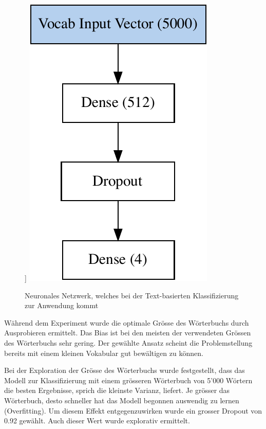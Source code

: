 \begin{figure}[h!]
    \captionsetup{width=.9\linewidth}
    \caption{Neuronales Netzwerk, welches bei der Text-basierten Klassifizierung zur Anwendung kommt}]
    \label{text-classification-model}
    \centering
    \includegraphics[scale=0.6]{graphics/text-classification/model.pdf}
\end{figure} 

Während dem Experiment wurde die optimale Grösse des Wörterbuchs durch Ausprobieren ermittelt. Das Bias ist bei den meisten der verwendeten Grössen des Wörterbuchs sehr gering. Der gewählte Ansatz scheint die Problemstellung bereits mit einem kleinen Vokabular gut bewältigen zu können.

Bei der Exploration der Grösse des Wörterbuchs wurde festgestellt, dass das Modell zur Klassifizierung mit einem grösseren Wörterbuch von 5'000 Wörtern die besten Ergebnisse, sprich die kleinste Varianz, liefert. Je grösser das Wörterbuch, desto schneller hat das Modell begonnen auswendig zu lernen (Overfitting). Um diesem Effekt entgegenzuwirken wurde ein grosser Dropout von 0.92 gewählt. Auch dieser Wert wurde explorativ ermittelt.

